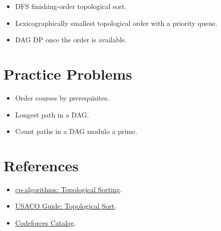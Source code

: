\begin{itemize}
  \item DFS finishing-order topological sort.
  \item Lexicographically smallest topological order with a priority queue.
  \item DAG DP once the order is available.
\end{itemize}

\section*{Practice Problems}

\begin{itemize}
  \item Order courses by prerequisites.
  \item Longest path in a DAG.
  \item Count paths in a DAG modulo a prime.
\end{itemize}

\section*{References}

\begin{itemize}
  \item \href{https://cp-algorithms.com/graph/topological-sort.html}{cp-algorithms: Topological Sorting}.
  \item \href{https://usaco.guide/gold/toposort?lang=cpp}{USACO Guide: Topological Sort}.
  \item \href{https://codeforces.com/catalog}{Codeforces Catalog}.
\end{itemize}

